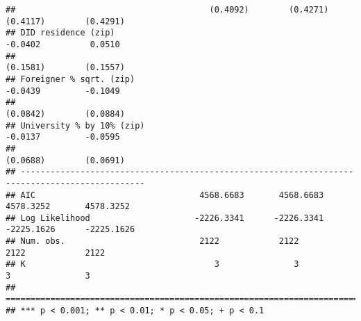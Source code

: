 \documentclass[
]{article}
\begin{document}
\begin{verbatim}
##                                       (0.4092)        (0.4271)       (0.4117)        (0.4291)  
## DID residence (zip)                                                  -0.0402          0.0510   
##                                                                      (0.1581)        (0.1557)  
## Foreigner % sqrt. (zip)                                              -0.0439         -0.1049   
##                                                                      (0.0842)        (0.0884)  
## University % by 10% (zip)                                            -0.0137         -0.0595   
##                                                                      (0.0688)        (0.0691)  
## -----------------------------------------------------------------------------------------------
## AIC                                 4568.6683       4568.6683      4578.3252       4578.3252   
## Log Likelihood                     -2226.3341      -2226.3341     -2225.1626      -2225.1626   
## Num. obs.                           2122            2122           2122            2122        
## K                                      3               3              3               3        
## ===============================================================================================
## *** p < 0.001; ** p < 0.01; * p < 0.05; + p < 0.1
\end{verbatim}
\end{document}
